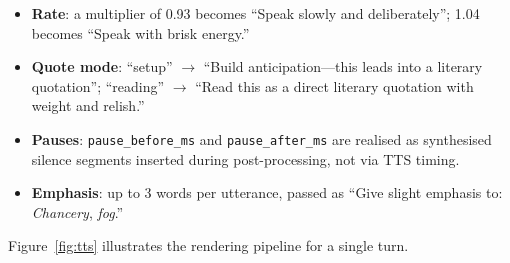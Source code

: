 \documentclass[final]{clv2025}
\begin{document}
\begin{itemize}
\item \textbf{Rate}: a multiplier of 0.93 becomes ``Speak slowly and
  deliberately''; 1.04 becomes ``Speak with brisk energy.''
\item \textbf{Quote mode}: ``setup'' $\to$ ``Build anticipation---this
  leads into a literary quotation''; ``reading'' $\to$ ``Read this as
  a direct literary quotation with weight and relish.''
\item \textbf{Pauses}: \texttt{pause\_before\_ms} and
  \texttt{pause\_after\_ms} are realised as synthesised silence
  segments inserted during post-processing, not via TTS timing.
\item \textbf{Emphasis}: up to 3 words per utterance, passed as
  ``Give slight emphasis to: \emph{Chancery}, \emph{fog}.''
\end{itemize}

Figure~\ref{fig:tts} illustrates the rendering pipeline for a single
turn.
\end{document}
